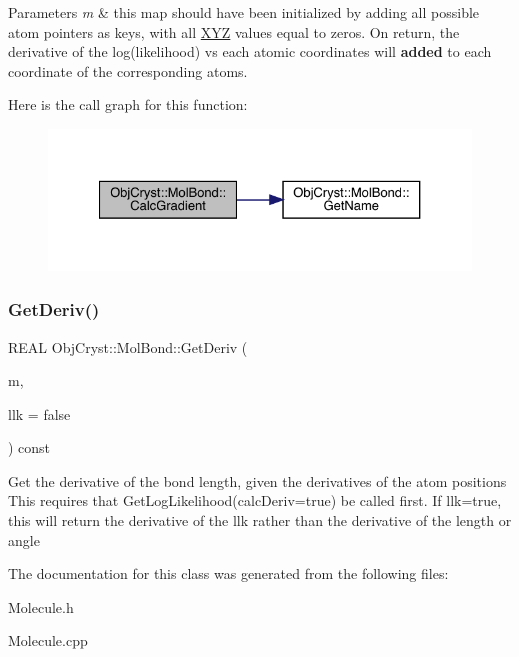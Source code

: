 \begin{DoxyParams}{Parameters}
{\em m} & this map should have been initialized by adding all possible atom pointers as keys, with all \mbox{\hyperlink{struct_obj_cryst_1_1_x_y_z}{X\+YZ}} values equal to zeros. On return, the derivative of the log(likelihood) vs each atomic coordinates will {\bfseries{added}} to each coordinate of the corresponding atoms. \\
\hline
\end{DoxyParams}
Here is the call graph for this function\+:
\nopagebreak
\begin{figure}[H]
\begin{center}
\leavevmode
\includegraphics[width=327pt]{class_obj_cryst_1_1_mol_bond_ab246b6300512a83e2edacd3a8bb99e94_cgraph}
\end{center}
\end{figure}
\mbox{\label{class_obj_cryst_1_1_mol_bond_a532cca2653bed88fe6fe82896abef6ee}} 
\subsubsection{\texorpdfstring{GetDeriv()}{GetDeriv()}}
{\footnotesize\ttfamily R\+E\+AL Obj\+Cryst\+::\+Mol\+Bond\+::\+Get\+Deriv (\begin{DoxyParamCaption}\item[{const std\+::map$<$ const \mbox{\hyperlink{class_obj_cryst_1_1_mol_atom}{Mol\+Atom}} $\ast$, \mbox{\hyperlink{struct_obj_cryst_1_1_x_y_z}{X\+YZ}} $>$ \&}]{m,  }\item[{const bool}]{llk = {\ttfamily false} }\end{DoxyParamCaption}) const}

Get the derivative of the bond length, given the derivatives of the atom positions This requires that Get\+Log\+Likelihood(calc\+Deriv=true) be called first. If llk=true, this will return the derivative of the llk rather than the derivative of the length or angle 

The documentation for this class was generated from the following files\+:\begin{DoxyCompactItemize}
\item 
Molecule.\+h\item 
Molecule.\+cpp\end{DoxyCompactItemize}
